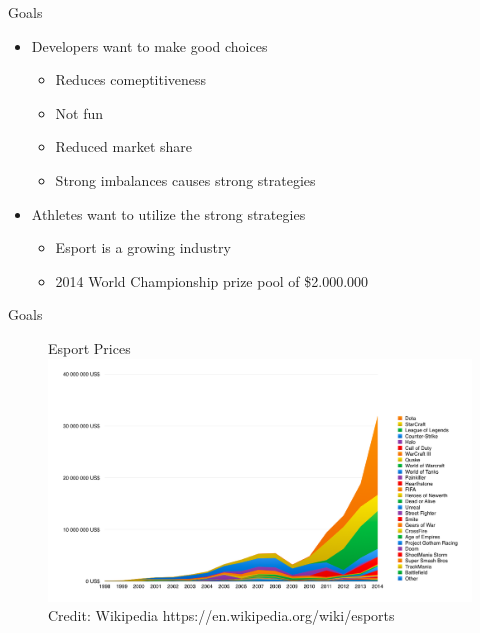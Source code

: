 \begin{frame}{Goals}
	\begin{itemize}
		\item Developers want to make good choices
			\begin{itemize}
			\item Reduces comeptitiveness
			\item Not fun
			\item Reduced market share 
			\item Strong imbalances causes strong strategies
			\end{itemize}
		
	\end{itemize}

	\begin{itemize}
		\item Athletes want to utilize the strong strategies
		\begin{itemize}
			\item Esport is a growing industry
			\item 2014 World Championship prize pool of \$2.000.000
		\end{itemize}
	\end{itemize}
	
\end{frame}

\begin{frame}{Goals}
	\begin{figure}[h!]
	  \centering
	  Esport Prices\\
	    \includegraphics[height=0.6\textwidth]{images/esport_prize.png}\\  
	     \tiny Credit: Wikipedia https://en.wikipedia.org/wiki/esports
\end{figure}

\end{frame}

